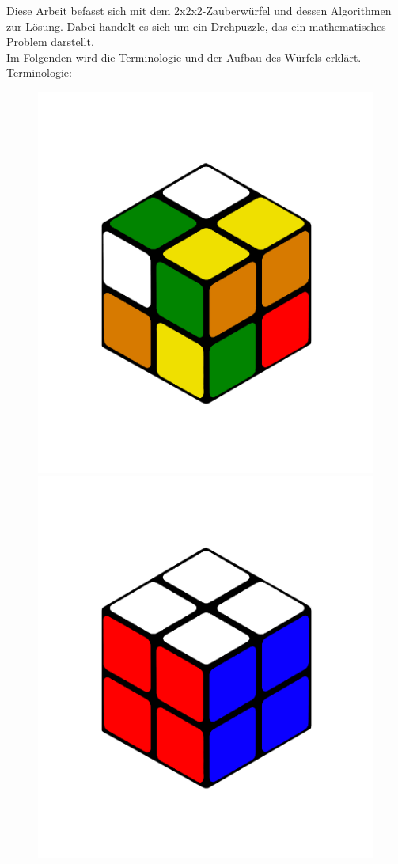 \documentclass[12pt,a4paper, usenames, dvipsnames]{article}
\begin{document}
Diese Arbeit befasst sich mit dem 2x2x2-Zauberwürfel und dessen Algorithmen zur Lösung. Dabei handelt es sich um ein Drehpuzzle, das ein mathematisches Problem darstellt. \\ 
Im Folgenden wird die Terminologie und der Aufbau des Würfels erklärt.\\
Terminologie:
\begin{figure}[h]
\centering
\includegraphics[scale=0.1]{2x2scrambled.png}
\includegraphics[scale=0.1]{2x2solved.png}

\end{figure}
\end{document}
